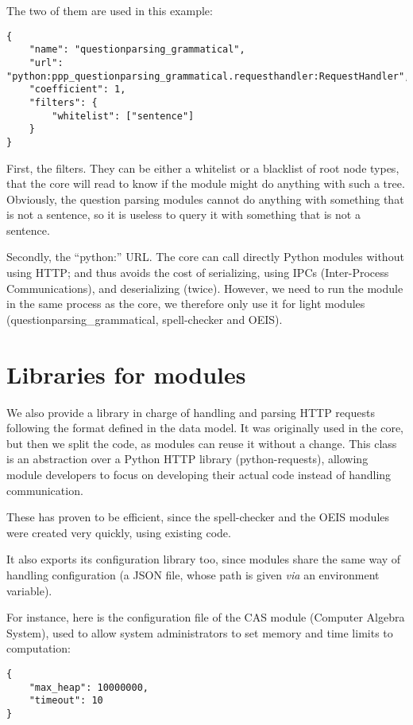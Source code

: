 The two of them are used in this example:

\begin{verbatim}
{
    "name": "questionparsing_grammatical",
    "url": "python:ppp_questionparsing_grammatical.requesthandler:RequestHandler",
    "coefficient": 1,
    "filters": {
        "whitelist": ["sentence"]
    }
}
\end{verbatim}

First, the filters. They can be
either a whitelist or a blacklist of root node types, that the core will
read to know if the module might do anything with such a tree.
Obviously, the question parsing modules cannot do anything with something
that is not a sentence, so it is useless to query it with something that
is not a sentence.

Secondly, the “python:” URL. The core can call directly Python modules
without using HTTP; and thus avoids the cost of serializing, using IPCs
(Inter-Process Communications), and deserializing (twice).
However, we need to run the module in the same process as the core, we therefore
only use it for light modules (questionparsing\_grammatical, spell-checker and OEIS).

\section{Libraries for modules}

We also provide a library in charge of handling and parsing HTTP
requests following the format defined in the data model. It was originally
used in the core, but then we split the code, as modules can reuse
it without a change.
This class is an abstraction over a Python HTTP library (python-requests),
allowing module developers to focus on developing their actual code
instead of handling communication.

These has proven to be efficient, since the spell-checker and the OEIS modules
were created very quickly, using existing code.

It also exports its configuration library too, since modules share the
same way of handling configuration (a JSON file, whose path
is given {\em via} an environment variable).

For instance, here is the configuration file of the CAS module (Computer Algebra
System), used to allow system administrators to set memory and time limits
to computation:

\begin{verbatim}
{
    "max_heap": 10000000,
    "timeout": 10
}
\end{verbatim}
